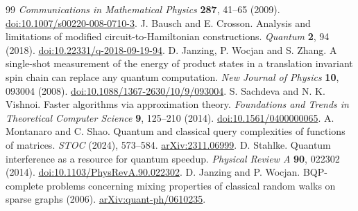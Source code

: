 \documentclass[11pt]{article}
\begin{document}
\begin{thebibliography}{99}
\emph{Communications in Mathematical Physics} \textbf{287}, 41--65 (2009).
\href{https://doi.org/10.1007/s00220-008-0710-3}{doi:10.1007/s00220-008-0710-3}.
 J. Bausch and E. Crosson.
Analysis and limitations of modified circuit-to-Hamiltonian constructions.
\emph{Quantum} \textbf{2}, 94 (2018).
\href{https://doi.org/10.22331/q-2018-09-19-94}{doi:10.22331/q-2018-09-19-94}.
 D. Janzing, P. Wocjan and S. Zhang.
A single-shot measurement of the energy of product states in a translation invariant spin chain can replace any quantum computation.
\emph{New Journal of Physics} \textbf{10}, 093004 (2008).
\href{https://doi.org/10.1088/1367-2630/10/9/093004}{doi:10.1088/1367-2630/10/9/093004}.
 S. Sachdeva and N. K. Vishnoi. Faster algorithms via approximation theory.
\emph{Foundations and Trends in Theoretical Computer Science} \textbf{9}, 125--210 (2014).
\href{https://doi.org/10.1561/0400000065}{doi:10.1561/0400000065}.
 A. Montanaro and C. Shao. Quantum and classical query complexities of functions of matrices.
\emph{STOC} (2024), 573--584. \href{https://arxiv.org/abs/2311.06999}{arXiv:2311.06999}.
 D. Stahlke. Quantum interference as a resource for quantum speedup.
\emph{Physical Review A} \textbf{90}, 022302 (2014).
\href{https://doi.org/10.1103/PhysRevA.90.022302}{doi:10.1103/PhysRevA.90.022302}.
 D. Janzing and P. Wocjan.
BQP-complete problems concerning mixing properties of classical random walks on sparse graphs (2006).
\href{https://arxiv.org/abs/quant-ph/0610235}{arXiv:quant-ph/0610235}.
\end{thebibliography}
\end{document}
